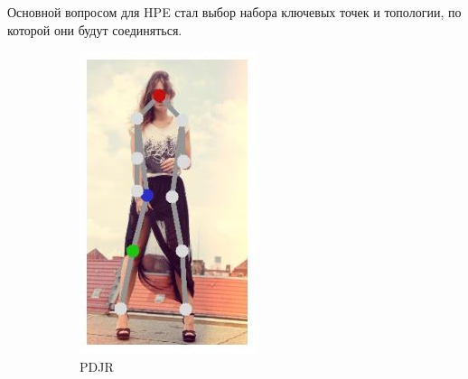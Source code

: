 Основной вопросом для HPE стал выбор набора ключевых точек и топологии, по которой они будут соединяться.

\begin{figure}[h]
\centering
\begin{subfigure}[b]{.16\textwidth}
	\centering
	\includegraphics[width=\textwidth]{./images/regpose_topology.png}
	\caption{PDJR \cite{PDJR}}
\end{subfigure}
\begin{subfigure}[b]{.3\textwidth}
	\centering

\end{subfigure}
\end{figure}
